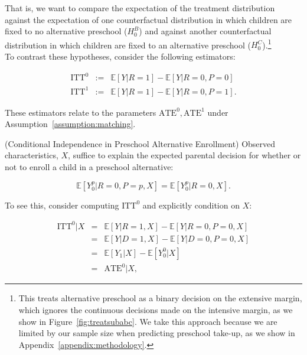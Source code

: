 \noindent That is, we want to compare the expectation of the treatment distribution against the expectation of one counterfactual distribution in which children are fixed to no alternative preschool ($H_{0}^B$) and against another counterfactual distribution in which children are fixed to an alternative preschool ($H_{0}^C$).\footnote{This treats alternative preschool as a binary decision on the extensive margin, which ignores the continuous decisions made on the intensive margin, as we show in Figure~\ref{fig:treatsubabc}. We take this approach because we are limited by our sample size when predicting preschool take-up, as we show in Appendix~\ref{appendix:methodology}.}\\

\noindent To contrast these hypotheses, consider the following estimators: 

\begin{eqnarray}
\text{ITT}^0 &:=& \mathbb{E} \left[ Y | R = 1 \right] - \mathbb{E} \left[ Y | R = 0, P = 0 \right] \label{eq:ittp0} \\
\text{ITT}^1 &:=& \mathbb{E} \left[ Y | R = 1 \right] - \mathbb{E} \left[ Y | R = 0, P = 1 \right]. \label{eq:ittp1}  
\end{eqnarray}

\noindent These estimators relate to the parameters $\text{ATE}^0, \text{ATE}^1$ under Assumption~\ref{assumption:matching}. 

\begin{assumption} \normalfont \label{assumption:matching} (Conditional Independence in Preschool Alternative Enrollment) Observed characteristics, $X$, suffice to explain the expected parental decision for whether or not to enroll a child in a preschool alternative:

\begin{equation}
\mathbb{E} \left [ Y_{0}^p |  R = 0, P = p, X \right] = \mathbb{E} \left [ Y_{0}^p |  R = 0, X \right].
\end{equation}
 \end{assumption}

\noindent To see this, consider computing $\text{ITT}^0$ and explicitly condition on $X$:

\begin{eqnarray}
\text{ITT}^0| X &=& \mathbb{E} \left[ Y | R = 1, X\right] - \mathbb{E} \left[ Y | R = 0, P = 0, X \right] \nonumber \\
                   &=& \mathbb{E}  \left[ Y | D = 1, X \right] - \mathbb{E} \left[ Y | D = 0, P = 0, X \right] \nonumber \\
                   &=& \mathbb{E}  \left[ Y_{1} | X \right] - \mathbb{E} \left[ Y_{0}^0 | X \right] \nonumber \\ 
                   &=& \text{ATE}^0 | X,
\end{eqnarray}

